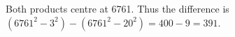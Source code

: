 Both products centre at 6761. Thus the difference is $(6761^2-3^2)-(6761^2-20^2)=400-9=\boxed{391}$.

